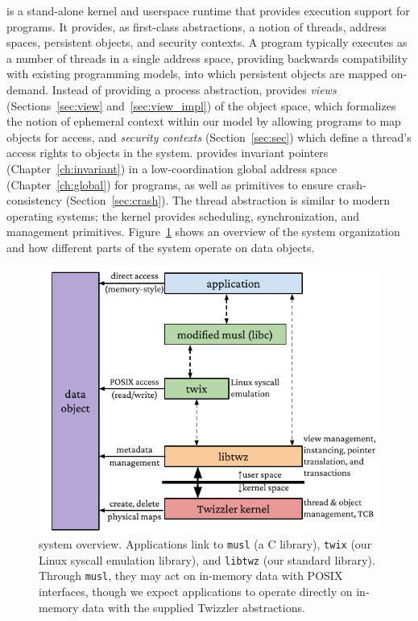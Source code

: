 \Twizzler is a stand-alone kernel and userspace runtime that provides execution support
for programs. It provides, as first-class abstractions, a notion of threads, address spaces,
persistent objects, and security contexts. A program
typically executes as a number of threads in a single address space, providing backwards
compatibility with existing programming models, into which persistent objects are mapped on-demand.
Instead of providing a process abstraction, \Twizzler provides \emph{views}
(Sections~\ref{sec:view} and~\ref{sec:view_impl}) of the object space, which formalizes the notion of ephemeral context within our
model by allowing programs to map objects for access,
and \emph{security contexts} (Section~\ref{sec:sec}) which define a thread's access rights to objects in the system.
\Twizzler provides invariant pointers (Chapter~\ref{ch:invariant}) in a low-coordination global address space (Chapter~\ref{ch:global}) for
programs, as well as primitives to ensure crash-consistency
(Section~\ref{sec:crash}). The thread abstraction is similar to modern operating systems; the
kernel provides scheduling, synchronization, and management primitives.
Figure~\ref{fig:twz_sys_overview} shows an overview of the system
organization and how different parts of the system operate on data objects.

\begin{figure}
    \centering
    \includegraphics[width=\linewidth]{fig/twz_sys_diag}
    \caption[Twizzler system overview]{\Twizzler system overview. Applications link to \texttt{musl} (a C library),
        \texttt{twix} (our Linux syscall emulation library), and \texttt{libtwz} (our standard
        library). Through \texttt{musl}, they may act on in-memory data with POSIX interfaces,
        though we expect \Twizzler applications to operate directly on in-memory data with
        the supplied Twizzler abstractions.}
    \label{fig:twz_sys_overview}
\end{figure}


